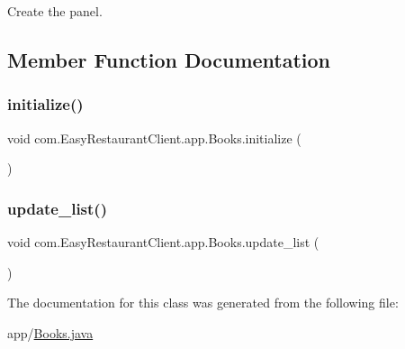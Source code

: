 Create the panel. 

\subsection{Member Function Documentation}
\mbox{\label{classcom_1_1_easy_restaurant_client_1_1app_1_1_books_a6e7d85012ac1c655fcafe0e8c50eb498}} 
\subsubsection{\texorpdfstring{initialize()}{initialize()}}
{\footnotesize\ttfamily void com.\+Easy\+Restaurant\+Client.\+app.\+Books.\+initialize (\begin{DoxyParamCaption}{ }\end{DoxyParamCaption})}

\mbox{\label{classcom_1_1_easy_restaurant_client_1_1app_1_1_books_ac3065fa01d5548d7be56bebcb21434b1}} 
\subsubsection{\texorpdfstring{update\_list()}{update\_list()}}
{\footnotesize\ttfamily void com.\+Easy\+Restaurant\+Client.\+app.\+Books.\+update\+\_\+list (\begin{DoxyParamCaption}{ }\end{DoxyParamCaption})}



The documentation for this class was generated from the following file\+:\begin{DoxyCompactItemize}
\item 
app/\mbox{\hyperlink{_books_8java}{Books.\+java}}\end{DoxyCompactItemize}
